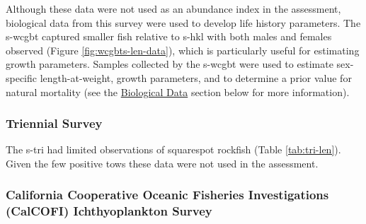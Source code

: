 \documentclass[11pt,
  english,
  a4paper,
]{article}
\begin{document}
\leavevmode\tagmcend\tagstructend\par


Although these data were not used as an abundance index in the assessment, biological data from this survey were used to develop life history parameters. The \gls{s-wcgbt} captured smaller fish relative to \gls{s-hkl} with both males and females observed (Figure \ref{fig:wcgbts-len-data}), which is particularly useful for estimating growth parameters. Samples collected by the \gls{s-wcgbt} were used to estimate sex-specific length-at-weight, growth parameters, and to determine a prior value for natural mortality (see the {\protect\hyperlink{biological_data}{Biological Data}\leavevmode\tagmcend\tagstructend} section below for more information).

\leavevmode\tagmcend\tagstructend\par


\hypertarget{triennial-survey}{%
\subsubsection{Triennial Survey}\label{triennial-survey}}

\leavevmode\tagmcend\tagstructend


The \gls{s-tri} had limited observations of squarespot rockfish (Table \ref{tab:tri-len}). Given the few positive tows these data were not used in the assessment.

\leavevmode\tagmcend\tagstructend\par


\hypertarget{california-cooperative-oceanic-fisheries-investigations-calcofi-ichthyoplankton-survey}{%
\subsubsection{California Cooperative Oceanic Fisheries Investigations (CalCOFI) Ichthyoplankton Survey}\label{california-cooperative-oceanic-fisheries-investigations-calcofi-ichthyoplankton-survey}}

\leavevmode\tagmcend\tagstructend

\end{document}
